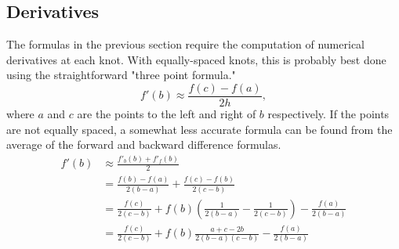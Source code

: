 \documentclass{scrartcl}
\begin{document}
\subsection{Derivatives}
The formulas in the previous section require the computation of
numerical derivatives at each knot. With equally-spaced knots, this
is probably best done using the straightforward "three point formula."
\begin{equation}
f'(b) \approx \frac{f(c)-f(a)}{2h},
\end{equation}
where $a$ and $c$ are the points to the left and right of $b$
respectively. If the points are not equally spaced, a somewhat less
accurate formula can be found from the average of the forward
and backward difference formulas.
\begin{align}
f'(b) &\approx \frac{f'_b(b)+f'_f(b)}{2}\\
&= \frac{f(b)-f(a)}{2(b-a)}+\frac{f(c)-f(b)}{2(c-b)}\\
&= \frac{f(c)}{2(c-b)}+f(b)\left(\frac{1}{2(b-a)}-\frac{1}{2(c-b)}\right)
	-\frac{f(a)}{2(b-a)}\\
&= \frac{f(c)}{2(c-b)}+f(b)\frac{a+c-2b}{2(b-a)(c-b)}
	-\frac{f(a)}{2(b-a)}
\end{align}

\appendix
\end{document}
